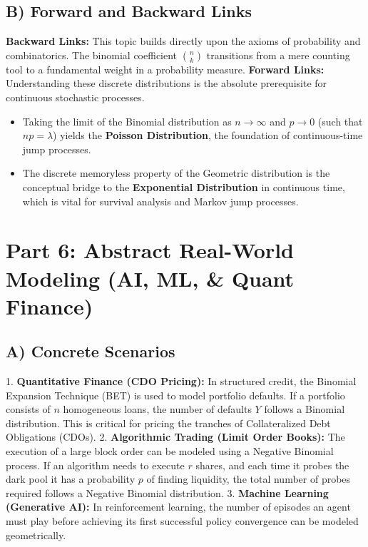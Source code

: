 \documentclass[11pt, letterpaper]{article}
\theoremstyle{definition}
\theoremstyle{remark}
\begin{document}
\subsection{B) Forward and Backward Links}
\textbf{Backward Links:} This topic builds directly upon the axioms of probability and combinatorics. The binomial coefficient $\binom{n}{k}$ transitions from a mere counting tool to a fundamental weight in a probability measure.
\textbf{Forward Links:} Understanding these discrete distributions is the absolute prerequisite for continuous stochastic processes. 
\begin{itemize}
    \item Taking the limit of the Binomial distribution as $n \to \infty$ and $p \to 0$ (such that $np = \lambda$) yields the \textbf{Poisson Distribution}, the foundation of continuous-time jump processes.
    \item The discrete memoryless property of the Geometric distribution is the conceptual bridge to the \textbf{Exponential Distribution} in continuous time, which is vital for survival analysis and Markov jump processes.
\end{itemize}

\section{Part 6: Abstract Real-World Modeling (AI, ML, \& Quant Finance)}

\subsection{A) Concrete Scenarios}
1. \textbf{Quantitative Finance (CDO Pricing):} In structured credit, the Binomial Expansion Technique (BET) is used to model portfolio defaults. If a portfolio consists of $n$ homogeneous loans, the number of defaults $Y$ follows a Binomial distribution. This is critical for pricing the tranches of Collateralized Debt Obligations (CDOs).
2. \textbf{Algorithmic Trading (Limit Order Books):} The execution of a large block order can be modeled using a Negative Binomial process. If an algorithm needs to execute $r$ shares, and each time it probes the dark pool it has a probability $p$ of finding liquidity, the total number of probes required follows a Negative Binomial distribution.
3. \textbf{Machine Learning (Generative AI):} In reinforcement learning, the number of episodes an agent must play before achieving its first successful policy convergence can be modeled geometrically.
\end{document}
